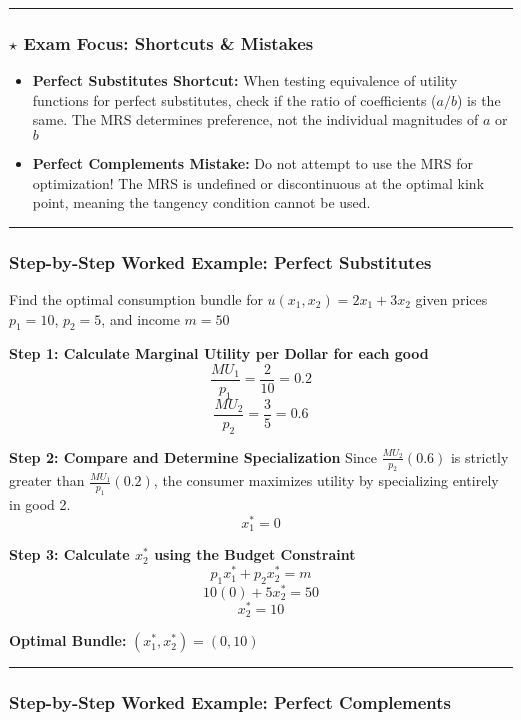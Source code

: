 \documentclass{article}
\begin{document}
\medskip\noindent\rule{\linewidth}{0.4pt}\medskip

\subsubsection*{$\star$ Exam Focus: Shortcuts \& Mistakes}
\begin{itemize}
    \item \textbf{Perfect Substitutes Shortcut:} When testing equivalence of utility functions for perfect substitutes, check if the ratio of coefficients ($a/b$) is the same. The MRS determines preference, not the individual magnitudes of $a$ or $b$
    \item \textbf{Perfect Complements Mistake:} Do not attempt to use the MRS for optimization! The MRS is undefined or discontinuous at the optimal kink point, meaning the tangency condition cannot be used.
\end{itemize}

\medskip\noindent\rule{\linewidth}{0.4pt}\medskip

\subsubsection*{Step-by-Step Worked Example: Perfect Substitutes}

Find the optimal consumption bundle for $u(x_1, x_2) = 2x_1 + 3x_2$ given prices $p_1=10$, $p_2=5$, and income $m=50$

\textbf{Step 1: Calculate Marginal Utility per Dollar for each good}
\[ \frac{MU_1}{p_1} = \frac{2}{10} = 0.2 \]
\[ \frac{MU_2}{p_2} = \frac{3}{5} = 0.6 \]

\textbf{Step 2: Compare and Determine Specialization}
Since $\frac{MU_2}{p_2} (0.6)$ is strictly greater than $\frac{MU_1}{p_1} (0.2)$, the consumer maximizes utility by specializing entirely in good 2.
\[ x_1^* = 0 \]

\textbf{Step 3: Calculate $x_2^*$ using the Budget Constraint}
\[ p_1 x_1^* + p_2 x_2^* = m \]
\[ 10(0) + 5x_2^* = 50 \]
\[ x_2^* = 10 \]

\textbf{Optimal Bundle:} $(x_1^*, x_2^*) = (0, 10)$

\medskip\noindent\rule{\linewidth}{0.4pt}\medskip

\subsubsection*{Step-by-Step Worked Example: Perfect Complements}
\end{document}
